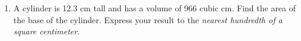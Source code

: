 \begin{enumerate}
\item A cylinder is 12.3 cm tall and has a volume of 966 cubic cm. Find the area of the base of the cylinder. Express your result to the \emph{nearest hundredth of a square centimeter}. \vspace{3cm}



\end{enumerate}
